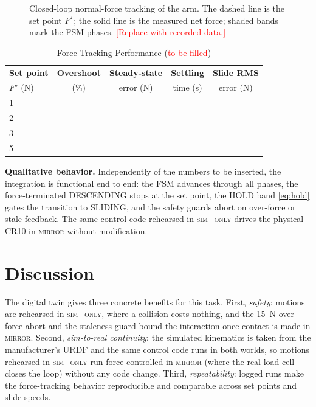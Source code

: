 \documentclass[conference]{IEEEtran}
\begin{document}
\begin{figure}[t]
  \centering
  \caption{Closed-loop normal-force tracking of the arm. The dashed line is the
  set point $F^\star$; the solid line is the measured net force; shaded bands
  mark the FSM phases. \textcolor{red}{[Replace with recorded data.]}}
  \label{fig:results}
\end{figure}

\begin{table}[t]
  \caption{Force-Tracking Performance (\textcolor{red}{to be filled})}
  \label{tab:results}
  \centering
  \begin{tabular}{@{}lcccc@{}}
    \toprule
    \textbf{Set point} & \textbf{Overshoot} & \textbf{Steady-state} &
    \textbf{Settling} & \textbf{Slide RMS}\\
    $F^\star$ (N) & (\%) & error (N) & time (s) & error (N)\\
    \midrule
    1 & & & & \\
    2 & & & & \\
    3 & & & & \\
    5 & & & & \\
    \bottomrule
  \end{tabular}
\end{table}

\textbf{Qualitative behavior.} Independently of the numbers to be inserted, the
integration is functional end to end: the FSM advances through all phases, the
force-terminated DESCENDING stops at the set point, the HOLD band \eqref{eq:hold}
gates the transition to SLIDING, and the safety guards abort on over-force or
stale feedback. The same control code rehearsed in \textsc{sim\_only} drives the
physical CR10 in \textsc{mirror} without modification.

\section{Discussion}
The digital twin gives three concrete benefits for this task. First,
\emph{safety}: motions are rehearsed in \textsc{sim\_only}, where a collision
costs nothing, and the \SI{15}{\newton} over-force abort and the staleness guard
bound the interaction once contact is made in \textsc{mirror}. Second,
\emph{sim-to-real continuity}: the simulated kinematics is taken from the
manufacturer's URDF and the same control code runs in both worlds, so motions
rehearsed in \textsc{sim\_only} run force-controlled in \textsc{mirror} (where
the real load cell closes the loop) without any code change. Third,
\emph{repeatability}: logged runs make the force-tracking behavior reproducible
and comparable across set points and slide speeds.
\end{document}

